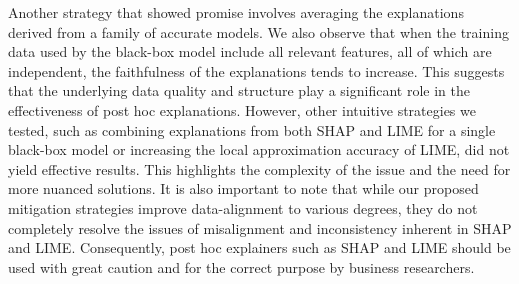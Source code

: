 \documentclass[mnsc,blindrev]{informs3}
\begin{document}
Another strategy that showed promise involves averaging the explanations derived from a family of accurate models. We also observe that when the training data used by the black-box model include all relevant features, all of which are independent, the faithfulness of the explanations tends to increase. This suggests that the underlying data quality and structure play a significant role in the effectiveness of post hoc explanations.
However, other intuitive strategies we tested, such as combining explanations from both SHAP and LIME for a single black-box model or increasing the local approximation accuracy of LIME, did not yield effective results. This highlights the complexity of the issue and the need for more nuanced solutions.
It is also important to note that while our proposed mitigation strategies improve data-alignment to various degrees, they do not completely resolve the issues of misalignment and inconsistency inherent in SHAP and LIME. Consequently, post hoc explainers such as SHAP and LIME should be used with great caution and for the correct purpose by business researchers. %

    
 

   

\end{document}
